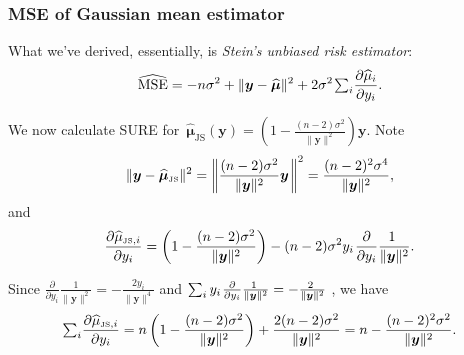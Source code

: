 \documentclass[18pt]{beamer}
\newcommand{\defineTightSpacing}{%
	\setlength{\abovedisplayskip}{.25\baselineskip}%
	\setlength{\belowdisplayskip}{.25\baselineskip}%
}
\renewcommand{\textsc}[1]{{\small \MakeUppercase{#1}}}
\newcommand{\thinnerspace}{\mskip.5\thinmuskip}
\newcommand{\js}[1]{\widehat{#1}_{\scriptscriptstyle \mathrm{JS}}}
\newcommand{\by}{\bm{y}}
\newcommand{\bmu}{\bm{\mu}}
\begin{document}
\begin{frame}
\frametitle{M{\normalsize SE} of Gaussian mean estimator}
What we've derived, essentially, is \textit{Stein's unbiased risk estimator}:
\begin{equation*} \defineTightSpacing%
\widehat{\operatorname{MSE}}
	= - n \sigma^2 +  \| \by - \widehat{\bmu} \|^2 
		+ 2 \sigma^2 \thinnerspace {\textstyle \sum_i} \frac{\partial \widehat{\mu}_i}{\partial y_i}.
\end{equation*}
\vspace*{-.7\baselineskip}

\pause%
We now calculate \textsc{SURE} for $\, \js{\bmu}(\by) = \left( 1 - \frac{(n - 2) \sigma^2}{\| \by \|^2} \right) \! \by$.
\pause%
Note
\begin{equation*} \defineTightSpacing%
\| \by - \js{\bmu} \|^2 
	= \left\| \frac{(n - 2) \sigma^2}{\| \by \|^2} \by \thinnerspace \right\|^2 
	= \frac{(n - 2)^2 \sigma^4}{\| \by \|^2},
\end{equation*}
\pause%
and
\begin{equation*} \defineTightSpacing%
\frac{\partial \widehat{\mu}_{{\scriptscriptstyle \mathrm{JS}}, i}}{\partial y_i}
	= \left( 1 - \frac{(n - 2) \sigma^2}{\| \by \|^2} \right) - (n - 2) \sigma^2 y_i \thinnerspace \frac{\partial}{\partial y_i} \frac{\!\!1}{\| \by \|^2}.
\end{equation*}

\pause%
\smallskip
Since $\frac{\partial}{\partial y_i} \frac{\!\!1}{\| \by \|^2} = - \frac{\!\!2 y_i}{\| \by \|^4}$ and $\sum_i  y_i \thinnerspace \frac{\partial}{\partial y_i} \frac{\!\!1}{\| \by \|^2} = - \frac{\!\!2}{\| \by \|^2}$ , we have
\begin{equation*} \defineTightSpacing%
{\textstyle \sum_i} \frac{\partial \widehat{\mu}_{{\scriptscriptstyle \mathrm{JS}}, i}}{\partial y_i}
	= n \left( 1 - \frac{(n - 2) \sigma^2}{\| \by \|^2} \right) + \frac{2 (n - 2) \sigma^2}{\| \by \|^2} %
	= n - \frac{(n - 2)^2 \sigma^2}{\| \by \|^2}.
\end{equation*}
\end{frame}
\end{document}
